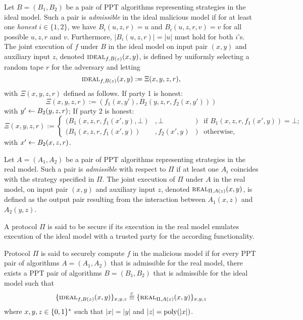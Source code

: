 \begin{definition}
Let $B=(B_1, B_2)$ be a pair of \ac{PPT} algorithms representing strategies in the ideal model.
Such a pair is \emph{admissible} in the ideal malicious model if for at least one \emph{honest} $i\in\{1,2\}$, we have $B_i(u, z, r)=u$ and $B_i(u, z, r, v)=v$ for all possible $u,z,r$ and $v$.
Furthermore, $|B_i(u, z, r)| = |u|$ must hold for both $i$'s.
The joint execution of $f$ under $B$ in the ideal model on input pair $(x, y)$ and auxiliary input $z$, denoted $\IDEAL_{f, B(z)} (x, y)$, is defined by uniformly selecting a random tape $r$ for the adversary and letting 
\[ \IDEAL_{f, B(z)} (x, y) := \Xi(x,y,z,r),\]
with $\Xi(x,y,z,r)$ defined as follows.
If party 1 is honest:
\[ \Xi(x,y,z,r) := (f_1(x,y'), B_2(y,z,r,f_2(x,y'))) \]
with $y'\gets B_2(y,z,r)$;
If party 2 is honest:
\[
 \Xi(x,y,z,r) := \left\{
 \begin{array}{lllr}
    (B_1(x, z, r, f_1(x',y), \bot)&, \bot&) &\text{if } B_1(x, z, r, f_1(x',y)) = \bot ;\\
    (B_1(x,z,r,f_1(x',y))&, f_2(x',y)&) &\text{otherwise,}
  \end{array}\right.
\]
with $x'\gets B_2(x,z,r)$.
\eod
\end{definition}

\begin{definition}
Let $A=(A_1, A_2)$ be a pair of \ac{PPT} algorithms representing strategies in the real model.
Such a pair is \emph{admissible} with respect to $\Pi$ if at least one $A_i$ coincides with the strategy specified in $\Pi$.
The joint execution of $\Pi$ under $A$ in the real model, on input pair $(x, y)$ and auxiliary input $z$, denoted $\REAL_{\Pi, A(z)}(x, y)$, is defined as the output pair resulting from the interaction between $A_1(x, z)$ and $A_2(y, z)$.
\eod
\end{definition}

\noindent
A protocol $\Pi$ is said to be secure if its execution in the real model emulates execution of the ideal model with a trusted party for the according functionality.

\begin{definition}
Protocol $\Pi$ is said to securely compute $f$ in the malicious model if for every \ac{PPT} pair of algorithms $A=(A_1, A_2)$ that is admissible for the real model, there exists a \ac{PPT} pair of algorithms $B=(B_1, B_2)$ that is admissible for the ideal model such that 
\[ \{\IDEAL_{f, B(z)}(x, y)\}_{x, y, z} \stackrel{c}{\equiv} \{\REAL_{\Pi, A(z)}(x, y)\}_{x, y, z} \]
where $x,y,z\in\{0,1\}^\ast$ such that $|x|=|y|$ and $|z|=\text{poly}(|x|)$.
\eod
\end{definition}

